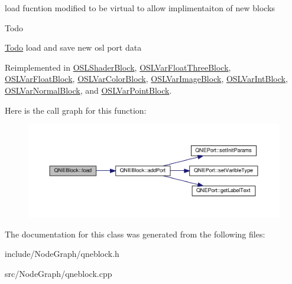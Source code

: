 load fucntion modified to be virtual to allow implimentaiton of new blocks 

\begin{DoxyRefDesc}{Todo}
\item[\hyperlink{todo__todo000014}{Todo}]load and save new osl port data \end{DoxyRefDesc}


Reimplemented in \hyperlink{class_o_s_l_shader_block_a9cf63f4ceb335aea5b6c2d7ba77d9d2c}{O\-S\-L\-Shader\-Block}, \hyperlink{class_o_s_l_var_float_three_block_a6c310fbded12f17c05e850a42b18f1e9}{O\-S\-L\-Var\-Float\-Three\-Block}, \hyperlink{class_o_s_l_var_float_block_ac0a7985ab09570956941088e53ad5956}{O\-S\-L\-Var\-Float\-Block}, \hyperlink{class_o_s_l_var_color_block_a53261128122303d6f22f0c92d77ef773}{O\-S\-L\-Var\-Color\-Block}, \hyperlink{class_o_s_l_var_image_block_a155e7a032f9df5e3c49edff6216a7348}{O\-S\-L\-Var\-Image\-Block}, \hyperlink{class_o_s_l_var_int_block_ad568fcf28fd1fd7824970bf0fd040149}{O\-S\-L\-Var\-Int\-Block}, \hyperlink{class_o_s_l_var_normal_block_a405ced7c8d4102426b41fac53e552771}{O\-S\-L\-Var\-Normal\-Block}, and \hyperlink{class_o_s_l_var_point_block_a47092371b17447b6ddb9b16af2253463}{O\-S\-L\-Var\-Point\-Block}.



Here is the call graph for this function\-:
\nopagebreak
\begin{figure}[H]
\begin{center}
\leavevmode
\includegraphics[width=350pt]{class_q_n_e_block_ab7fb118bd4bcf8aa224d03807a6dc315_cgraph}
\end{center}
\end{figure}




The documentation for this class was generated from the following files\-:\begin{DoxyCompactItemize}
\item 
include/\-Node\-Graph/qneblock.\-h\item 
src/\-Node\-Graph/qneblock.\-cpp\end{DoxyCompactItemize}
